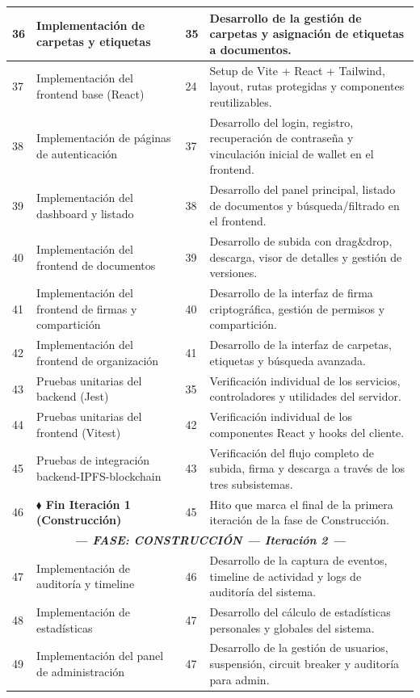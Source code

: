 \documentclass[11pt, a4paper]{article}
\begin{document}
\begin{longtable}{|p{1cm}|p{5.5cm}|p{1.5cm}|p{5.5cm}|}
\hline
36 & Implementación de carpetas y etiquetas & 35 & Desarrollo de la gestión de carpetas y asignación de etiquetas a documentos. \\
\hline
37 & Implementación del frontend base (React) & 24 & Setup de Vite + React + Tailwind, layout, rutas protegidas y componentes reutilizables. \\
\hline
38 & Implementación de páginas de autenticación & 37 & Desarrollo del login, registro, recuperación de contraseña y vinculación inicial de wallet en el frontend. \\
\hline
39 & Implementación del dashboard y listado & 38 & Desarrollo del panel principal, listado de documentos y búsqueda/filtrado en el frontend. \\
\hline
40 & Implementación del frontend de documentos & 39 & Desarrollo de subida con drag\&drop, descarga, visor de detalles y gestión de versiones. \\
\hline
41 & Implementación del frontend de firmas y compartición & 40 & Desarrollo de la interfaz de firma criptográfica, gestión de permisos y compartición. \\
\hline
42 & Implementación del frontend de organización & 41 & Desarrollo de la interfaz de carpetas, etiquetas y búsqueda avanzada. \\
\hline
43 & Pruebas unitarias del backend (Jest) & 35 & Verificación individual de los servicios, controladores y utilidades del servidor. \\
\hline
44 & Pruebas unitarias del frontend (Vitest) & 42 & Verificación individual de los componentes React y hooks del cliente. \\
\hline
45 & Pruebas de integración backend-IPFS-blockchain & 43 & Verificación del flujo completo de subida, firma y descarga a través de los tres subsistemas. \\
\hline
46 & \textbf{$\blacklozenge$ Fin Iteración 1 (Construcción)} & 45 & Hito que marca el final de la primera iteración de la fase de Construcción. \\
\hline
\multicolumn{4}{|c|}{\textit{\textbf{--- FASE: CONSTRUCCIÓN --- Iteración 2 ---}}} \\
\hline
47 & Implementación de auditoría y timeline & 46 & Desarrollo de la captura de eventos, timeline de actividad y logs de auditoría del sistema. \\
\hline
48 & Implementación de estadísticas & 47 & Desarrollo del cálculo de estadísticas personales y globales del sistema. \\
\hline
49 & Implementación del panel de administración & 47 & Desarrollo de la gestión de usuarios, suspensión, circuit breaker y auditoría para admin. \\

\end{longtable}
\end{document}
